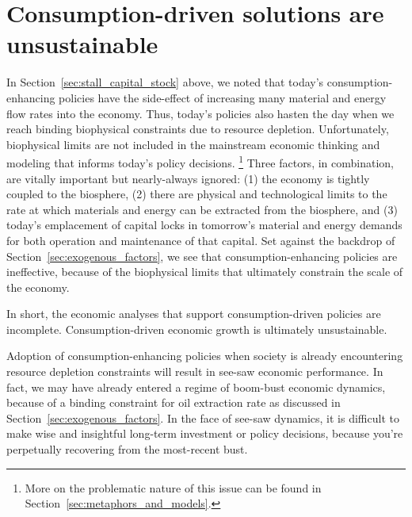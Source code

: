 

\section{Consumption-driven solutions are unsustainable}
\label{sec:consumption_unsustainable}

In Section~\ref{sec:stall_capital_stock} above, 
we noted that today's consumption-enhancing policies have the side-effect of
increasing many material and energy flow rates into the economy.
Thus, today's policies also
hasten the day when we reach binding biophysical constraints
due to resource depletion. 
Unfortunately, biophysical limits 
are not included in the mainstream economic thinking and modeling
that informs today's policy decisions.%
	\footnote{
	More on the problematic nature of this issue
	can be found in Section~\ref{sec:metaphors_and_models}.
	}
Three factors, in combination, are vitally important 
but nearly-always ignored: 
(1) the economy is tightly coupled to the biosphere, 
(2) there are physical and technological limits 
	to the rate at which materials and energy can be extracted 
	from the biosphere, and 
(3) today's emplacement of capital locks in
	tomorrow's material and energy demands 
	for both operation and maintenance of that capital.
Set against the backdrop of Section~\ref{sec:exogenous_factors},
we see that consumption-enhancing policies are ineffective,
because of the biophysical limits that ultimately constrain the scale of the economy. 

In short, the economic analyses that support 
consumption-driven policies are incomplete.
Consumption-driven economic growth is ultimately unsustainable.

Adoption of consumption-enhancing policies when society is already encountering
resource depletion constraints
will result in see-saw economic performance. 
In fact, we may have already entered a regime of boom-bust economic dynamics,
because of a binding constraint for oil extraction rate
as discussed in Section~\ref{sec:exogenous_factors}.
In the face of see-saw dynamics,
it is difficult to make wise and insightful long-term investment or policy decisions,
because you're perpetually recovering from the most-recent bust.

